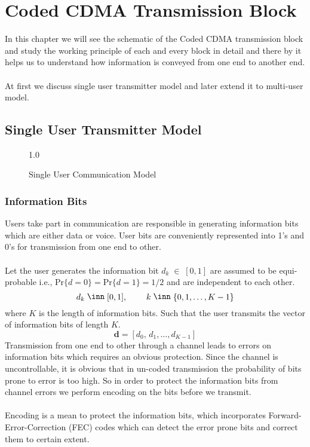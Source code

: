 \chapter{Coded CDMA Transmission Block}
In this chapter we will see the schematic of the Coded CDMA transmission block and study the working principle of each and every block in detail and there by it helps us to understand how information is conveyed from one end to another end.\\ \\
At first we discuss single user transmitter model and later extend it to multi-user model.
\section{Single User Transmitter Model}
\begin{figure}[htb]
\centerline{  {1.0} }
\caption{Single User Communication Model}
\end{figure}
\subsection{Information Bits}
Users take part in communication are responsible in generating information bits which are either data or voice. User bits are conveniently represented into 1's and 0's for transmission from one end to other.\\ \\
Let the user generates the information bit $d_k\;\in\;[0,1]$ are assumed to be equi-probable i.e., $\mathrm{Pr}\{d=0\}=\mathrm{Pr}\{d=1\}=1/2$ and are independent to each other.
\begin{equation}
d_k\;\in\;[0,1],\hspace{8mm} k\;\in\;\{0,1,\dots,K-1\}
\end{equation}
where $K$ is the length of information bits. Such that the user transmits the vector of information bits of length $K$. 
\begin{equation}
\mathrm{\mathbf{d}}=[d_0,\,d_1,\dots,d_{K-1}]
\end{equation}
Transmission from one end to other through a channel leads to errors on information bits which requires an obvious protection. Since the channel is uncontrollable, it is obvious that in un-coded transmission the probability of bits prone to error is too high. So in order to protect the information bits from channel errors we perform encoding on the bits before we transmit.\\ \\
Encoding is a mean to protect the information bits, which incorporates Forward-Error-Correction (FEC) codes which can detect the error prone bits and correct them to certain extent.

